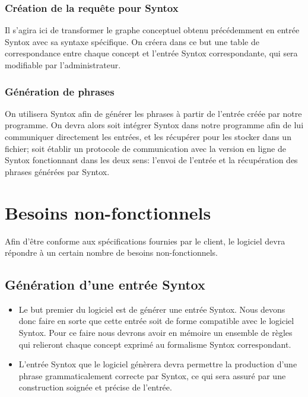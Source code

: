\documentclass[12pt]{report}
\begin{document}
\subsubsection{Création de la requête pour Syntox}

Il s'agira ici de transformer le graphe conceptuel obtenu précédemment en entrée Syntox avec sa syntaxe spécifique. On créera dans ce but une table de correspondance entre chaque concept et l'entrée Syntox correspondante, qui sera modifiable par l'administrateur.

\subsubsection{Génération de phrases}

On utilisera Syntox afin de générer les phrases à partir de l'entrée créée par notre programme.
On devra alors soit intégrer Syntox dans notre programme afin de lui communiquer directement les entrées, et les récupérer pour les stocker dans un fichier; soit établir un protocole de communication avec la version en ligne de Syntox fonctionnant dans les deux sens: l'envoi de l'entrée et la récupération des phrases générées par Syntox.

\section{Besoins non-fonctionnels}

Afin d'être conforme aux spécifications fournies par le client, le logiciel devra répondre à un certain nombre de besoins non-fonctionnels.

\subsection{Génération d'une entrée Syntox}

\begin{itemize}
	\item Le but premier du logiciel est de générer une entrée Syntox. Nous devons donc faire en sorte que cette entrée soit de forme compatible avec le logiciel Syntox. Pour ce faire nous devrons avoir en mémoire un ensemble de règles qui relieront chaque concept exprimé au formalisme Syntox correspondant.
	\item L'entrée Syntox que le logiciel génèrera devra permettre la production d'une phrase grammaticalement correcte par Syntox, ce qui sera assuré par une construction soignée et précise de l'entrée.
\end{itemize}
\end{document}
